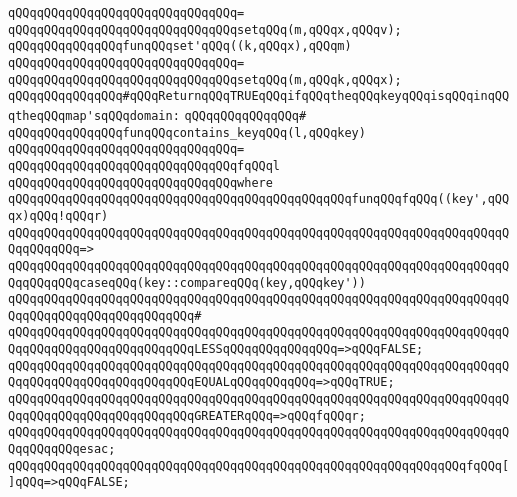 \verb|qQQqqQQqqQQqqQQqqQQqqQQqqQQqqQQq=|\newline
\verb|qQQqqQQqqQQqqQQqqQQqqQQqqQQqqQQqsetqQQq(m,qQQqx,qQQqv);|\newline
\newline
\newline
\verb|qQQqqQQqqQQqqQQqfunqQQqset'qQQq((k,qQQqx),qQQqm)|\newline
\verb|qQQqqQQqqQQqqQQqqQQqqQQqqQQqqQQq=|\newline
\verb|qQQqqQQqqQQqqQQqqQQqqQQqqQQqqQQqsetqQQq(m,qQQqk,qQQqx);|\newline
\newline
\verb|qQQqqQQqqQQqqQQq#qQQqReturnqQQqTRUEqQQqifqQQqtheqQQqkeyqQQqisqQQqinqQQqtheqQQqmap'sqQQqdomain:|\newline
\verb|qQQqqQQqqQQqqQQq#|\newline
\verb|qQQqqQQqqQQqqQQqfunqQQqcontains_keyqQQq(l,qQQqkey)|\newline
\verb|qQQqqQQqqQQqqQQqqQQqqQQqqQQqqQQq=|\newline
\verb|qQQqqQQqqQQqqQQqqQQqqQQqqQQqqQQqfqQQql|\newline
\verb|qQQqqQQqqQQqqQQqqQQqqQQqqQQqqQQqwhere|\newline
\verb|qQQqqQQqqQQqqQQqqQQqqQQqqQQqqQQqqQQqqQQqqQQqqQQqfunqQQqfqQQq((key',qQQqx)qQQq!qQQqr)|\newline
\verb|qQQqqQQqqQQqqQQqqQQqqQQqqQQqqQQqqQQqqQQqqQQqqQQqqQQqqQQqqQQqqQQqqQQqqQQqqQQqqQQq=>|\newline
\verb|qQQqqQQqqQQqqQQqqQQqqQQqqQQqqQQqqQQqqQQqqQQqqQQqqQQqqQQqqQQqqQQqqQQqqQQqqQQqqQQqcaseqQQq(key::compareqQQq(key,qQQqkey'))|\newline
\verb|qQQqqQQqqQQqqQQqqQQqqQQqqQQqqQQqqQQqqQQqqQQqqQQqqQQqqQQqqQQqqQQqqQQqqQQqqQQqqQQqqQQqqQQqqQQqqQQq#|\newline
\verb|qQQqqQQqqQQqqQQqqQQqqQQqqQQqqQQqqQQqqQQqqQQqqQQqqQQqqQQqqQQqqQQqqQQqqQQqqQQqqQQqqQQqqQQqqQQqqQQqLESSqQQqqQQqqQQqqQQq=>qQQqFALSE;|\newline
\verb|qQQqqQQqqQQqqQQqqQQqqQQqqQQqqQQqqQQqqQQqqQQqqQQqqQQqqQQqqQQqqQQqqQQqqQQqqQQqqQQqqQQqqQQqqQQqqQQqEQUALqQQqqQQqqQQq=>qQQqTRUE;|\newline
\verb|qQQqqQQqqQQqqQQqqQQqqQQqqQQqqQQqqQQqqQQqqQQqqQQqqQQqqQQqqQQqqQQqqQQqqQQqqQQqqQQqqQQqqQQqqQQqqQQqGREATERqQQq=>qQQqfqQQqr;|\newline
\verb|qQQqqQQqqQQqqQQqqQQqqQQqqQQqqQQqqQQqqQQqqQQqqQQqqQQqqQQqqQQqqQQqqQQqqQQqqQQqqQQqesac;|\newline
\newline
\verb|qQQqqQQqqQQqqQQqqQQqqQQqqQQqqQQqqQQqqQQqqQQqqQQqqQQqqQQqqQQqqQQqfqQQq[]qQQq=>qQQqFALSE;|\newline
